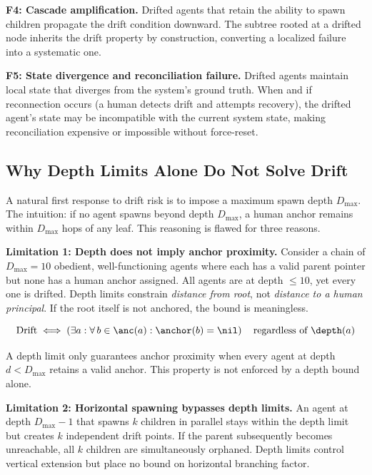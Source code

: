 \medskip
\noindent\textbf{F4: Cascade amplification.} Drifted agents that retain the ability to spawn children propagate the drift condition downward. The subtree rooted at a drifted node inherits the drift property by construction, converting a localized failure into a systematic one.

\medskip
\noindent\textbf{F5: State divergence and reconciliation failure.} Drifted agents maintain local state that diverges from the system's ground truth. When and if reconnection occurs (a human detects drift and attempts recovery), the drifted agent's state may be incompatible with the current system state, making reconciliation expensive or impossible without force-reset.

\subsection{Why Depth Limits Alone Do Not Solve Drift}

A natural first response to drift risk is to impose a maximum spawn depth $D_{\max}$. The intuition: if no agent spawns beyond depth $D_{\max}$, a human anchor remains within $D_{\max}$ hops of any leaf. This reasoning is flawed for three reasons.

\medskip
\noindent\textbf{Limitation 1: Depth does not imply anchor proximity.} Consider a chain of $D_{\max} = 10$ obedient, well-functioning agents where each has a valid parent pointer but none has a human anchor assigned. All agents are at depth $\leq 10$, yet every one is drifted. Depth limits constrain \emph{distance from root}, not \emph{distance to a human principal}. If the root itself is not anchored, the bound is meaningless.

\begin{equation}
\text{Drift} \iff \left(\exists a: \forall\, b \in \anc(a): \anchor(b) = \nil\right)
\quad\text{regardless of } \depth(a)
\end{equation}

A depth limit only guarantees anchor proximity when every agent at depth $d < D_{\max}$ retains a valid anchor. This property is not enforced by a depth bound alone.

\medskip
\noindent\textbf{Limitation 2: Horizontal spawning bypasses depth limits.} An agent at depth $D_{\max} - 1$ that spawns $k$ children in parallel stays within the depth limit but creates $k$ independent drift points. If the parent subsequently becomes unreachable, all $k$ children are simultaneously orphaned. Depth limits control vertical extension but place no bound on horizontal branching factor.

